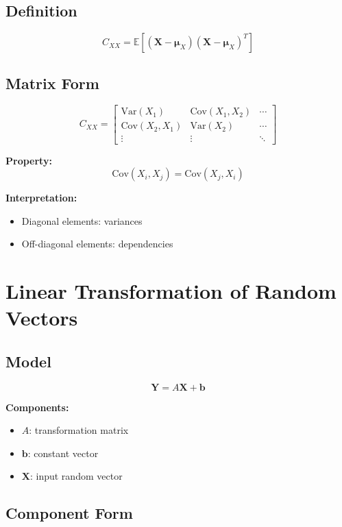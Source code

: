 \documentclass[11pt]{article}
\begin{document}
\subsection{Definition}

\[
C_{XX} = \mathbb{E}\left[(\mathbf{X} - \boldsymbol{\mu}_X)(\mathbf{X} - \boldsymbol{\mu}_X)^T\right]
\]

\subsection{Matrix Form}

\[
C_{XX} =
\begin{bmatrix}
\mathrm{Var}(X_1) & \mathrm{Cov}(X_1,X_2) & \cdots \\
\mathrm{Cov}(X_2,X_1) & \mathrm{Var}(X_2) & \cdots \\
\vdots & \vdots & \ddots
\end{bmatrix}
\]

\textbf{Property:}
\[
\mathrm{Cov}(X_i,X_j) = \mathrm{Cov}(X_j,X_i)
\]

\textbf{Interpretation:}
\begin{itemize}
    \item Diagonal elements: variances
    \item Off-diagonal elements: dependencies
\end{itemize}

\section{Linear Transformation of Random Vectors}

\subsection{Model}

\[
\mathbf{Y} = A\mathbf{X} + \mathbf{b}
\]

\textbf{Components:}
\begin{itemize}
    \item $A$: transformation matrix
    \item $\mathbf{b}$: constant vector
    \item $\mathbf{X}$: input random vector
\end{itemize}

\subsection{Component Form}
\end{document}
